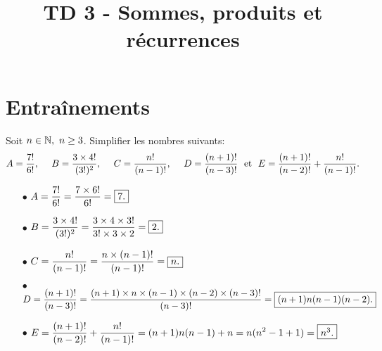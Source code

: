 \documentclass[a4paper, 11pt,reqno]{article}
\newcommand{\type}{TD }
\begin{document}
\title{\type  3 - Sommes, produits et récurrences}


\section*{Entraînements}


\vspace{0.2cm}

\begin{exercice}  \;
\noindent Soit $n\in\mathbb{N},\ n\geq 3$. Simplifier les nombres suivants:
$$A=\ddp\frac{7!}{6!},\ \ \ \ B=\ddp\frac{3\times 4!}{(3!)^2},\ \ \ \ 
C=\ddp\frac{n!}{(n-1)!},\ \ \ \ D=\ddp\frac{(n+1)!}{(n-3)!}\ \ \hbox{et}\ \ E=\ddp\frac{(n+1)!}{(n-2)!}+\ddp\frac{n!}{(n-1)!}.$$
\end{exercice}
\vspace{0.4cm} 



\begin{correction}  \; \vsec
\begin{itemize}
\item[$\bullet$] $A=\displaystyle\frac{7!}{6!}=\displaystyle\frac{7\times 6!}{6!}=\fbox{$7.$}$
\item[$\bullet$] $B=\displaystyle\frac{3\times 4!}{(3!)^2}=\displaystyle\frac{3\times 4\times 3!}{3!\times 3\times 2}=\fbox{$2$.}$
\item[$\bullet$] $C=\displaystyle\frac{n!}{(n-1)!}=\displaystyle\frac{n\times (n-1)!}{(n-1)!}=\fbox{$n$.}$
\item[$\bullet$] $D=\displaystyle\frac{(n+1)!}{(n-3)!}=\displaystyle\frac{(n+1)\times n\times (n-1)\times (n-2)\times (n-3)!}{(n-3)!}=\fbox{$(n+1) n (n-1) (n-2)$.}$
\item[$\bullet$] $E=\displaystyle\frac{(n+1)!}{(n-2)!}+\displaystyle\frac{n!}{(n-1)!}=(n+1)n(n-1)+n=n(n^2-1+1)=\fbox{$n^3$.}$
\end{itemize}
\end{correction}
\vspace{0.4cm}
\end{document}
